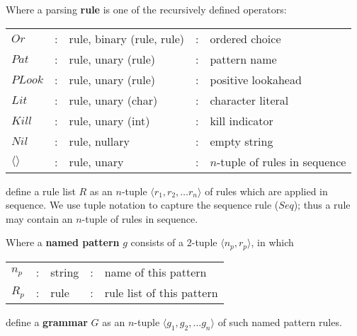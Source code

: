 \begin{framed}

 Where a parsing \textbf{rule} is one of the recursively defined operators:

  \begin{center}
   \begin{tabular}{lclcl}
    $Or $  & : & rule, binary (rule, rule) & : & ordered choice      \\
    $Pat$  & : & rule, unary  (rule)       & : & pattern name        \\
    $PLook$& : & rule, unary  (rule)       & : & positive lookahead  \\
    $Lit$  & : & rule, unary  (char)       & : & character literal   \\
    $Kill$ & : & rule, unary  (int)        & : & kill indicator      \\
    $Nil$  & : & rule, nullary             & : & empty string        \\
$\langle \rangle$  
           & : & rule, unary               & : & $n$-tuple of rules in sequence \\
   \end{tabular}
  \end{center}

  define a rule list $R$ as an $n$-tuple $\langle r_1, r_2, \ldots r_n \rangle$
of rules which are applied in sequence.  We use tuple notation to capture the
sequence rule ($Seq$); thus a rule may contain an $n$-tuple of rules in
sequence.

\end{framed}

\begin{framed}

 Where a \textbf{named pattern} $g$ consists of a 2-tuple $\langle n_p, r_p
 \rangle$, in which 

  \begin{center}
   \begin{tabular}{lclcl}
    $n_p$ & : & string     & : & name of this pattern      \\ 
    $R_p$ & : & rule       & : & rule list of this pattern \\
   \end{tabular}
  \end{center}

  define a \textbf{grammar} $G$ as an $n$-tuple $\langle g_1, g_2, \ldots g_n
  \rangle$ of such named pattern rules.

\end{framed}
